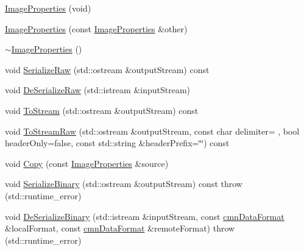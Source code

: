 \begin{DoxyCompactItemize}
\item 
\hyperlink{classsvl_filter_source_video_capture_types_1_1_image_properties_ad709e23a4f0e5f3856ac8626f7f8dc1d}{Image\+Properties} (void)
\item 
\hyperlink{classsvl_filter_source_video_capture_types_1_1_image_properties_ae71750e9c7aab4a95525cfcce65851cc}{Image\+Properties} (const \hyperlink{classsvl_filter_source_video_capture_types_1_1_image_properties}{Image\+Properties} \&other)
\item 
\hyperlink{classsvl_filter_source_video_capture_types_1_1_image_properties_a79bf3229bf3a2a3c8fa8196d538b6f40}{$\sim$\+Image\+Properties} ()
\item 
void \hyperlink{classsvl_filter_source_video_capture_types_1_1_image_properties_a0bfeb614b1031762721d8c06826dbebe}{Serialize\+Raw} (std\+::ostream \&output\+Stream) const 
\item 
void \hyperlink{classsvl_filter_source_video_capture_types_1_1_image_properties_a20f51efaa79f3d6d0a8571bebea9885f}{De\+Serialize\+Raw} (std\+::istream \&input\+Stream)
\item 
void \hyperlink{classsvl_filter_source_video_capture_types_1_1_image_properties_a035a3afa0326124323b4852da4c3cd3d}{To\+Stream} (std\+::ostream \&output\+Stream) const 
\item 
void \hyperlink{classsvl_filter_source_video_capture_types_1_1_image_properties_a9d922c804f763419207a013da79c2e0d}{To\+Stream\+Raw} (std\+::ostream \&output\+Stream, const char delimiter= \textquotesingle{} \textquotesingle{}, bool header\+Only=false, const std\+::string \&header\+Prefix=\char`\"{}\char`\"{}) const 
\item 
void \hyperlink{classsvl_filter_source_video_capture_types_1_1_image_properties_a278b0b1474db20ab0ed7c7ce5b54375c}{Copy} (const \hyperlink{classsvl_filter_source_video_capture_types_1_1_image_properties}{Image\+Properties} \&source)
\item 
void \hyperlink{classsvl_filter_source_video_capture_types_1_1_image_properties_a016075e213c049c1967f5497d3e75e80}{Serialize\+Binary} (std\+::ostream \&output\+Stream) const   throw (std\+::runtime\+\_\+error)
\item 
void \hyperlink{classsvl_filter_source_video_capture_types_1_1_image_properties_aa7b6e4e87eaf82edaa8688f184896e16}{De\+Serialize\+Binary} (std\+::istream \&input\+Stream, const \hyperlink{classcmn_data_format}{cmn\+Data\+Format} \&local\+Format, const \hyperlink{classcmn_data_format}{cmn\+Data\+Format} \&remote\+Format)  throw (std\+::runtime\+\_\+error)

\end{DoxyCompactItemize}
